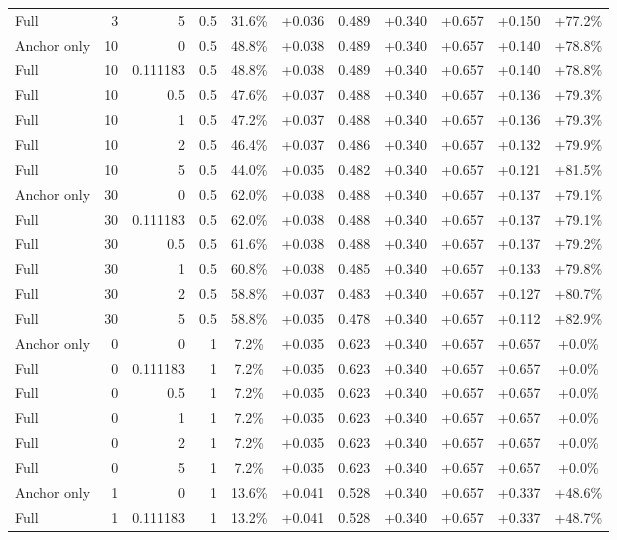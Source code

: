 \begin{table}[htbp]
\begin{tabular}{lrrrccccccc}
Full & 3 & 5 & 0.5 & 31.6\% & +0.036 & 0.489 & +0.340 & +0.657 & +0.150 & +77.2\% \\
Anchor only & 10 & 0 & 0.5 & 48.8\% & +0.038 & 0.489 & +0.340 & +0.657 & +0.140 & +78.8\% \\
Full & 10 & 0.111183 & 0.5 & 48.8\% & +0.038 & 0.489 & +0.340 & +0.657 & +0.140 & +78.8\% \\
Full & 10 & 0.5 & 0.5 & 47.6\% & +0.037 & 0.488 & +0.340 & +0.657 & +0.136 & +79.3\% \\
Full & 10 & 1 & 0.5 & 47.2\% & +0.037 & 0.488 & +0.340 & +0.657 & +0.136 & +79.3\% \\
Full & 10 & 2 & 0.5 & 46.4\% & +0.037 & 0.486 & +0.340 & +0.657 & +0.132 & +79.9\% \\
Full & 10 & 5 & 0.5 & 44.0\% & +0.035 & 0.482 & +0.340 & +0.657 & +0.121 & +81.5\% \\
Anchor only & 30 & 0 & 0.5 & 62.0\% & +0.038 & 0.488 & +0.340 & +0.657 & +0.137 & +79.1\% \\
Full & 30 & 0.111183 & 0.5 & 62.0\% & +0.038 & 0.488 & +0.340 & +0.657 & +0.137 & +79.1\% \\
Full & 30 & 0.5 & 0.5 & 61.6\% & +0.038 & 0.488 & +0.340 & +0.657 & +0.137 & +79.2\% \\
Full & 30 & 1 & 0.5 & 60.8\% & +0.038 & 0.485 & +0.340 & +0.657 & +0.133 & +79.8\% \\
Full & 30 & 2 & 0.5 & 58.8\% & +0.037 & 0.483 & +0.340 & +0.657 & +0.127 & +80.7\% \\
Full & 30 & 5 & 0.5 & 58.8\% & +0.035 & 0.478 & +0.340 & +0.657 & +0.112 & +82.9\% \\
Anchor only & 0 & 0 & 1 & 7.2\% & +0.035 & 0.623 & +0.340 & +0.657 & +0.657 & +0.0\% \\
Full & 0 & 0.111183 & 1 & 7.2\% & +0.035 & 0.623 & +0.340 & +0.657 & +0.657 & +0.0\% \\
Full & 0 & 0.5 & 1 & 7.2\% & +0.035 & 0.623 & +0.340 & +0.657 & +0.657 & +0.0\% \\
Full & 0 & 1 & 1 & 7.2\% & +0.035 & 0.623 & +0.340 & +0.657 & +0.657 & +0.0\% \\
Full & 0 & 2 & 1 & 7.2\% & +0.035 & 0.623 & +0.340 & +0.657 & +0.657 & +0.0\% \\
Full & 0 & 5 & 1 & 7.2\% & +0.035 & 0.623 & +0.340 & +0.657 & +0.657 & +0.0\% \\
Anchor only & 1 & 0 & 1 & 13.6\% & +0.041 & 0.528 & +0.340 & +0.657 & +0.337 & +48.6\% \\
Full & 1 & 0.111183 & 1 & 13.2\% & +0.041 & 0.528 & +0.340 & +0.657 & +0.337 & +48.7\% \\

\end{tabular}
\end{table}
